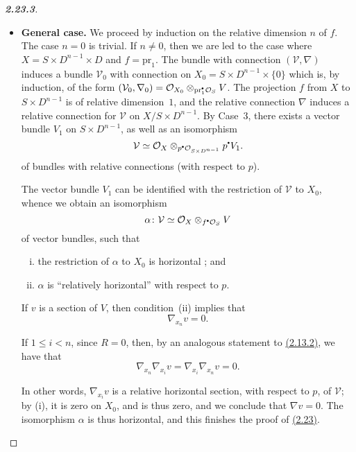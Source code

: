 \documentclass{report}
\renewcommand{\cal}[1]{{\mathcal{#1}}}
\newcommand{\sbullet}{{\mathbin{\vcenter{\hbox{\scalebox{.5}{$\bullet$}}}}}}
\newcommand{\pr}{\mathrm{pr}}
\renewcommand{\leq}{\leqslant}
\newcommand{\oldpage}[1]{\marginpar{\footnotesize$\Big\vert$ \textit{p.~#1}}}
\begin{document}
\begin{proof}[\normalfont\textbf{2.23.3}]
\begin{itemize}
      We can suppose that $S$ is a closed analytic subset of $D^n$, and that $X=S\times D$ and $f=\pr_1$.
      The relative local systems (resp. the modules with relative connections) on $X$ can then be identified with the local relative systems (resp. the modules with relative connections) on $D^n\times D$ that are annihilated by the inverse image of the ideal that defines $S$, and we conclude by using Case~2.
    \item[] \textbf{General case.}
      We proceed by induction on the relative dimension $n$ of $f$.
      The case $n=0$ is trivial.
      If $n\neq0$, then we are led to the case where $X=S\times D^{n-1}\times D$ and $f=\pr_1$.
      The bundle with connection $(\cal{V},\nabla)$ induces a bundle $\cal{V}_0$ with connection on $X_0=S\times D^{n-1}\times\{0\}$ which is, by induction, of the form $(\cal{V}_0,\nabla_0) = \cal{O}_{X_0}\otimes_{\pr_1^\sbullet\cal{O}_S}V$.
      The projection $f$ from $X$ to $S\times D^{n-1}$ is of relative dimension~$1$, and the relative connection $\nabla$ induces a relative connection for $\cal{V}$ on $X/S\times D^{n-1}$.
      By Case~3, there exists a vector bundle $V_1$ on $S\times D^{n-1}$, as well as an isomorphism
      \[
        \cal{V} \simeq \cal{O}_X\otimes_{p^\sbullet\cal{O}_{S\times D^{n-1}}}p^\sbullet V_1.
      \]
      of bundles with relative connections (with respect to $p$).

      The vector bundle $V_1$ can be identified with the restriction of $\cal{V}$ to $X_0$, whence we obtain an isomorphism
      \[
        \alpha\colon \cal{V}\simeq\cal{O}_X\otimes_{f^\sbullet\cal{O}_S}V
      \]
      of vector bundles, such that
      \begin{enumerate}[(i)]
        \item the restriction of $\alpha$ to $X_0$ is horizontal ; and
        \item $\alpha$ is ``relatively horizontal'' with respect to $p$.
      \end{enumerate}

      If $v$ is a section of $V$, then condition~(ii) implies that
      \[
        \nabla_{x_n}v = 0.
      \]

      If $1\leq i<n$, since $R=0$, then, by an analogous statement to \hyperref[I.2.13.2]{(2.13.2)}, we have that
      \[
        \nabla_{x_n}\nabla_{x_i}v = \nabla_{x_i}\nabla_{x_n}v = 0.
      \]

      In other words, $\nabla_{x_i}v$ is a relative horizontal section, with respect to $p$, of $\cal{V}$;
      by (i), it is zero on $X_0$, and is thus zero, and we conclude that $\nabla v=0$.
      The isomorphism $\alpha$ is thus horizontal, and this finishes the proof
\oldpage{19}
      of \hyperref[I.2.23]{(2.23)}.
  \end{itemize}
\end{proof}
\end{document}

